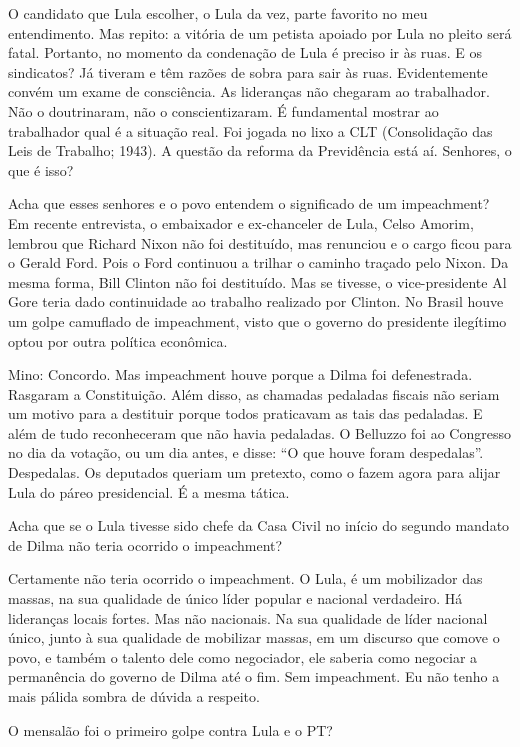  O candidato que Lula escolher, o Lula da vez, parte favorito no meu
entendimento. Mas repito: a vitória de um petista apoiado por Lula no
pleito será fatal. Portanto, no momento da condenação de Lula é preciso
ir às ruas. E os sindicatos? Já tiveram e têm razões de sobra para sair
às ruas. Evidentemente convém um exame de consciência. As lideranças não
chegaram ao trabalhador. Não o doutrinaram, não o conscientizaram. É
fundamental mostrar ao trabalhador qual é a situação real. Foi jogada no
lixo a CLT (Consolidação das Leis de Trabalho; 1943). A questão da
reforma da Previdência está aí. Senhores, o que é isso?

 Acha que esses senhores e o povo entendem o significado de um
impeachment? Em recente entrevista, o embaixador e ex-chanceler de Lula,
Celso Amorim, lembrou que Richard Nixon não foi destituído, mas
renunciou e o cargo ficou para o Gerald Ford. Pois o Ford continuou a
trilhar o caminho traçado pelo Nixon. Da mesma forma, Bill Clinton não
foi destituído. Mas se tivesse, o vice-presidente Al Gore teria dado
continuidade ao trabalho realizado por Clinton. No Brasil houve um golpe
camuflado de impeachment, visto que o governo do presidente ilegítimo
optou por outra política econômica.

Mino: Concordo. Mas impeachment houve porque a Dilma foi defenestrada.
Rasgaram a Constituição. Além disso, as chamadas pedaladas fiscais não
seriam um motivo para a destituir porque todos praticavam as tais das
pedaladas. E além de tudo reconheceram que não havia pedaladas. O
Belluzzo foi ao Congresso no dia da votação, ou um dia antes, e disse:
``O que houve foram despedalas''. Despedalas. Os deputados queriam um
pretexto, como o fazem agora para alijar Lula do páreo presidencial. É a
mesma tática.

 Acha que se o Lula tivesse sido chefe da Casa Civil no início do
segundo mandato de Dilma não teria ocorrido o impeachment?

 Certamente não teria ocorrido o impeachment. O Lula, é um mobilizador
das massas, na sua qualidade de único líder popular e nacional
verdadeiro. Há lideranças locais fortes. Mas não nacionais. Na sua
qualidade de líder nacional único, junto à sua qualidade de mobilizar
massas, em um discurso que comove o povo, e também o talento dele como
negociador, ele saberia como negociar a permanência do governo de Dilma
até o fim. Sem impeachment. Eu não tenho a mais pálida sombra de dúvida
a respeito.

 O mensalão foi o primeiro golpe contra Lula e o PT?

